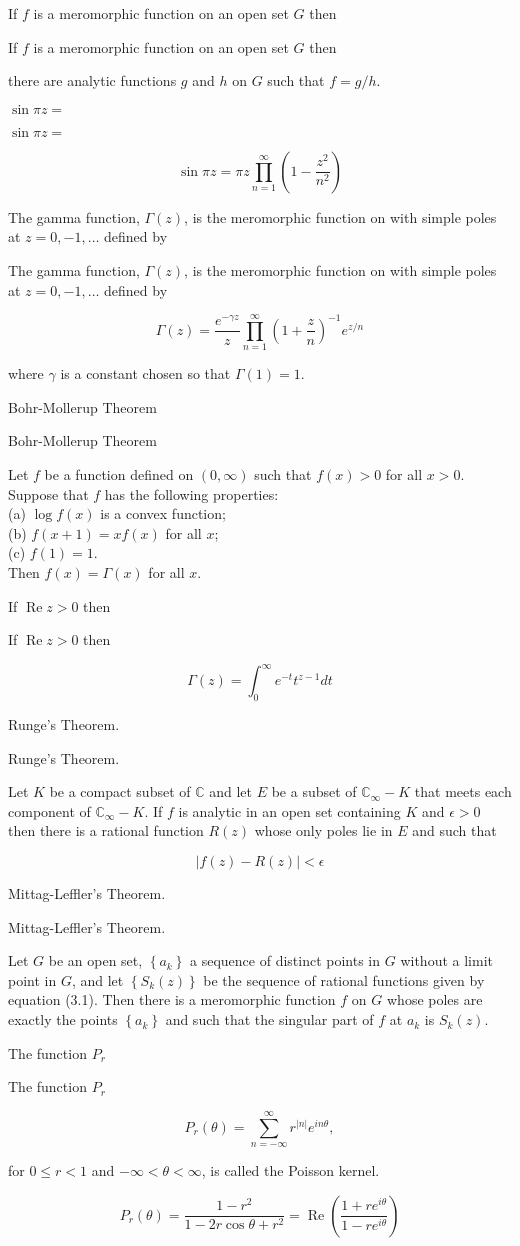 \documentclass[17pt]{extarticle}
\newcommand{\boxset}[2]{\begin{mdframed}[style=darkQuesion]
#1
\end{mdframed}
\newpage
\begin{mdframed}[style=darkQuesion]
#1
  \end{mdframed}
\begin{mdframed}[style=darkAnswer]
#2
  \end{mdframed}
  \newpage
}
\begin{document}
\boxset{If $f$ is a meromorphic function on an open set $G$ then}
{there are analytic functions $g$ and $h$ on $G$ such that $f=g / h$.}

\boxset{$\sin \pi z=$}
{

\[
\sin \pi z=\pi z \prod_{n=1}^{\infty}\left(1-\frac{z^{2}}{n^{2}}\right)
\]

}

\boxset{The gamma function, $\Gamma(z)$, is the meromorphic function on with simple poles at $z=0,-1, \ldots$ defined by}
{

\[
\Gamma(z)=\frac{e^{-\gamma z}}{z} \prod_{n=1}^{\infty}\left(1+\frac{z}{n}\right)^{-1} e^{z / n}
\]

where $\gamma$ is a constant chosen so that $\Gamma(1)=1$.
}
\boxset{Bohr-Mollerup Theorem}
{Let $f$ be a function defined on $(0, \infty)$ such that $f(x)>0$ for all $x>0$. Suppose that $f$ has the following properties:\[\ \]
(a) $\log f(x)$ is a convex function;\[\ \]
(b) $f(x+1)=x f(x)$ for all $x$;\[\ \]
(c) $f(1)=1$.\[\ \]
Then $f(x)=\Gamma(x)$ for all $x$.\[\ \]
}

\boxset{If $\operatorname{Re} z>0$ then}
{

\[
\Gamma(z)=\int_{0}^{\infty} e^{-t} t^{z-1} d t
\]

}

\boxset{Runge's Theorem.}
{Let $K$ be a compact subset of $\mathbb{C}$ and let $E$ be a subset of $\mathbb{C}_{\infty}-K$ that meets each component of $\mathbb{C}_{\infty}-K$. If $f$ is analytic in an open set containing $K$ and $\epsilon>0$ then there is a rational function $R(z)$ whose only poles lie in $E$ and such that

\[
|f(z)-R(z)|<\epsilon
\]

}

\boxset{Mittag-Leffler's Theorem.}
{Let $G$ be an open set, $\left\{a_{k}\right\}$ a sequence of distinct points in $G$ without a limit point in $G$, and let $\left\{S_{k}(z)\right\}$ be the sequence of rational functions given by equation (3.1). Then there is a meromorphic function $f$ on $G$ whose poles are exactly the points $\left\{a_{k}\right\}$ and such that the singular part of $f$ at $a_{k}$ is $S_{k}(z)$.}

\boxset{The function $P_r$}
{
\[
P_{r}(\theta)=\sum_{n=-\infty}^{\infty} r^{|n|} e^{i n \theta},
\]

for $0 \leq r<1$ and $-\infty<\theta<\infty$, is called the Poisson kernel.

\[
P_{r}(\theta)=\frac{1-r^{2}}{1-2 r \cos \theta+r^{2}}=\operatorname{Re}\left(\frac{1+r e^{i \theta}}{1-r e^{i \theta}}\right)
\]

}
\end{document}
